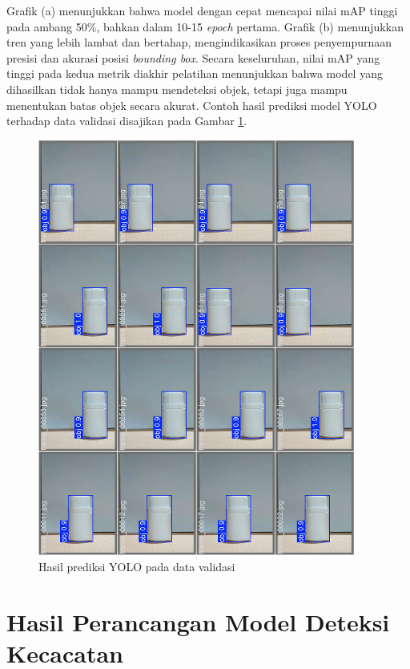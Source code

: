 Grafik (a) menunjukkan bahwa model dengan cepat mencapai nilai mAP
tinggi pada ambang 50\%, bahkan dalam 10-15 \textit{epoch} pertama.
Grafik (b) menunjukkan tren yang lebih lambat dan bertahap,
mengindikasikan proses penyempurnaan presisi dan akurasi posisi
\textit{bounding box}. Secara keseluruhan, nilai mAP yang tinggi pada
kedua metrik diakhir
pelatihan menunjukkan bahwa model yang dihasilkan tidak hanya mampu
mendeteksi objek, tetapi juga mampu menentukan batas objek secara akurat.
Contoh hasil prediksi model YOLO terhadap data validasi disajikan
pada Gambar \ref{fig:yolo-validasi}.

\begin{figure}[H]
  \centering
  \includegraphics[width=0.93\textwidth]{gambar/yolo_validasi.jpg}
  \caption{Hasil prediksi YOLO pada data validasi}
  \label{fig:yolo-validasi}
\end{figure}
\vspace{-1em}

\vspace{1em}

\section{Hasil Perancangan Model Deteksi Kecacatan}
